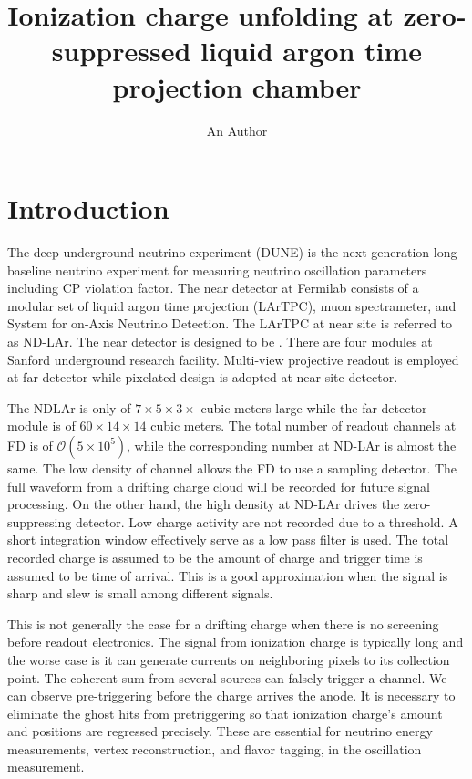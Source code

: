 \documentclass[a4paper,11pt]{article}
\title{\boldmath Ionization charge unfolding at zero-suppressed liquid argon time projection chamber}
\author{An Author}
\affiliation{Physics Department, Brookhaven National Laboratory,\\
Upton, NY, 11973 U.S.A}
\begin{document}
\maketitle
\flushbottom

\section{Introduction}
\label{sec:intro}

The deep underground neutrino experiment (DUNE) is the next generation long-baseline neutrino experiment for measuring neutrino oscillation parameters including CP violation factor. The near detector at Fermilab consists of a modular set of liquid argon time projection (LArTPC), muon spectrameter, and System for on-Axis Neutrino Detection. The LArTPC at near site is referred to as ND-LAr. The near detector is designed to be . There are four modules at Sanford underground research facility. Multi-view projective readout is employed at far detector while pixelated design is adopted at near-site detector.

The NDLAr is only of $7\times 5 \times 3\times$ cubic meters large while the far detector module is of $60 \times 14 \times 14$ cubic meters. The total number of readout channels at FD is of $\mathcal{O}(5\times 10^5)$, while the corresponding number at ND-LAr is almost the same. The low density of channel allows the FD to use a sampling detector. The full waveform from a drifting charge cloud will be recorded for future signal processing. On the other hand, the high density at ND-LAr drives the zero-suppressing detector. Low charge activity are not recorded due to a threshold. A short integration window effectively serve as a low pass filter is used. The total recorded charge is assumed to be the amount of charge and trigger time is assumed to be time of arrival. This is a good approximation when the signal is sharp and slew is small among different signals.

This is not generally the case for a drifting charge when there is no screening before readout electronics. The signal from ionization charge is typically long and the worse case is it can generate currents on neighboring pixels to its collection point. The coherent sum from several sources can falsely trigger a channel. We can observe pre-triggering before the charge arrives the anode. It is necessary to eliminate the ghost hits from pretriggering so that ionization charge's amount and positions are regressed precisely. These are essential for neutrino energy measurements, vertex reconstruction, and flavor tagging, in the oscillation measurement.
\end{document}
